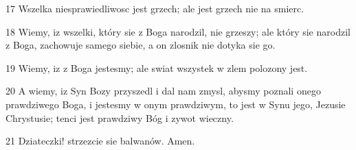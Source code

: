 \par 17 Wszelka niesprawiedliwosc jest grzech; ale jest grzech nie na smierc.
\par 18 Wiemy, iz wszelki, który sie z Boga narodzil, nie grzeszy; ale który sie narodzil z Boga, zachowuje samego siebie, a on zlosnik nie dotyka sie go.
\par 19 Wiemy, iz z Boga jestesmy; ale swiat wszystek w zlem polozony jest.
\par 20 A wiemy, iz Syn Bozy przyszedl i dal nam zmysl, abysmy poznali onego prawdziwego Boga, i jestesmy w onym prawdziwym, to jest w Synu jego, Jezusie Chrystusie; tenci jest prawdziwy Bóg i zywot wieczny.
\par 21 Dziateczki! strzezcie sie balwanów. Amen.


